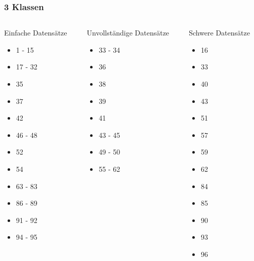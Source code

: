 \begin{frame}
  \frametitle{3 Klassen}
\begin{columns}
  \begin{column}{0.33\textwidth}
  Einfache Datensätze
  \begin{itemize}
  \item 1 - 15
  \item 17 - 32
  \item 35
  \item 37
  \item 42
  \item 46 - 48
  \item 52
  \item 54
  \item 63 - 83
  \item 86 - 89
  \item 91 - 92
  \item 94 - 95
  \end{itemize}
  \end{column}
    \begin{column}{0.33\textwidth}
    Unvollständige Datensätze
    \begin{itemize}
    \item 33 - 34
    \item 36
    \item 38
    \item 39
    \item 41
    \item 43 - 45
    \item 49 - 50
    \item 55 - 62
    \end{itemize}
    \end{column}
  \begin{column}{0.33\textwidth}
  Schwere Datensätze
  \begin{itemize}
  \item 16
  \item 33
  \item 40
  \item 43
  \item 51
  \item 57
  \item 59
  \item 62
  \item 84
  \item 85
  \item 90
  \item 93
  \item 96
  \end{itemize}
  \end{column}
\end{columns}
\end{frame}
